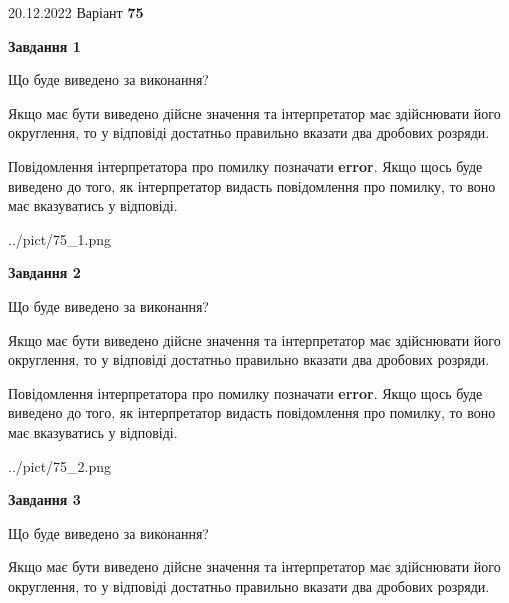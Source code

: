 \documentclass[12pt, ukrainian]{article}
\begin{document}
{20.12.2022 Варіант \No \textbf { 75 }\par}
{
\begin {Large}

{\begin {center}\textbf{Завдання 1}\end {center}}\par
Що буде виведено за виконання? \par

Якщо має бути виведено дійсне значення та інтерпретатор має здійснювати його округлення, 
то у відповіді достатньо правильно вказати два дробових розряди.

Повідомлення інтерпретатора про помилку позначати \textbf{error}.
Якщо щось буде виведено до того, як інтерпретатор видасть повідомлення про помилку, 
то воно має вказуватись у відповіді. \par

\begin{center}
	{../pict/75_1.png}
\end{center}
\newpage

{\begin {center}\textbf{Завдання 2}\end {center}}\par
Що буде виведено за виконання? \par

Якщо має бути виведено дійсне значення та інтерпретатор має здійснювати його округлення, 
то у відповіді достатньо правильно вказати два дробових розряди.

Повідомлення інтерпретатора про помилку позначати \textbf{error}.
Якщо щось буде виведено до того, як інтерпретатор видасть повідомлення про помилку, 
то воно має вказуватись у відповіді. \par

\begin{center}
	{../pict/75_2.png}
\end{center}
\newpage

{\begin {center}\textbf{Завдання 3}\end {center}}\par
Що буде виведено за виконання? \par

Якщо має бути виведено дійсне значення та інтерпретатор має здійснювати його округлення, 
то у відповіді достатньо правильно вказати два дробових розряди.


\end{Large}}
\end{document}
